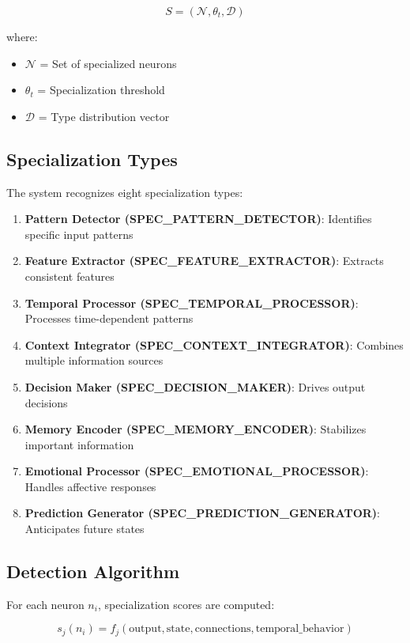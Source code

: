 \documentclass{article}
\begin{document}
\begin{equation}
S = (\mathcal{N}, \theta_t, \mathcal{D})
\end{equation}

where:
\begin{itemize}[leftmargin=*]
\item $\mathcal{N}$ = Set of specialized neurons
\item $\theta_t$ = Specialization threshold
\item $\mathcal{D}$ = Type distribution vector
\end{itemize}

\subsection{Specialization Types}
The system recognizes eight specialization types:

\begin{enumerate}[leftmargin=*]
\item \textbf{Pattern Detector (SPEC\_PATTERN\_DETECTOR)}: Identifies specific input patterns
\item \textbf{Feature Extractor (SPEC\_FEATURE\_EXTRACTOR)}: Extracts consistent features
\item \textbf{Temporal Processor (SPEC\_TEMPORAL\_PROCESSOR)}: Processes time-dependent patterns
\item \textbf{Context Integrator (SPEC\_CONTEXT\_INTEGRATOR)}: Combines multiple information sources
\item \textbf{Decision Maker (SPEC\_DECISION\_MAKER)}: Drives output decisions
\item \textbf{Memory Encoder (SPEC\_MEMORY\_ENCODER)}: Stabilizes important information
\item \textbf{Emotional Processor (SPEC\_EMOTIONAL\_PROCESSOR)}: Handles affective responses
\item \textbf{Prediction Generator (SPEC\_PREDICTION\_GENERATOR)}: Anticipates future states
\end{enumerate}

\subsection{Detection Algorithm}
For each neuron $n_i$, specialization scores are computed:

\begin{equation}
s_j(n_i) = f_j(\text{output}, \text{state}, \text{connections}, \text{temporal\_behavior})
\end{equation}
\end{document}
